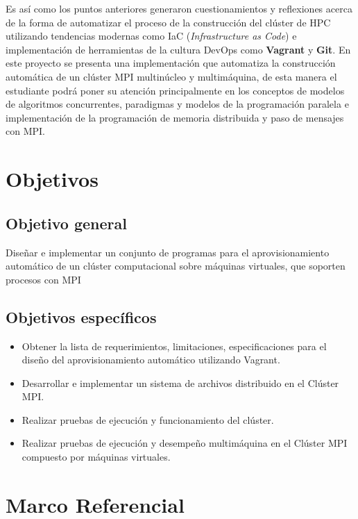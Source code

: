 \documentclass[letterpaper, 12pt, oneside]{article}
\begin{document}
    Es así como los puntos anteriores generaron cuestionamientos y reflexiones acerca de la forma de automatizar el proceso de la construcción del clúster de HPC utilizando tendencias modernas como IaC (\textit{Infrastructure as Code}) e implementación de herramientas de la cultura DevOps como \textbf{Vagrant} y \textbf{Git}. 
    En  este  proyecto  se  presenta  una  implementación que automatiza la construcción automática de un clúster MPI multinúcleo y multimáquina, de esta manera el estudiante podrá poner su atención principalmente en los conceptos de modelos de algoritmos concurrentes, paradigmas y modelos de la programación paralela e implementación de la programación de memoria distribuida y paso de mensajes con MPI. 
    
	\section{Objetivos}
	
	\subsection{Objetivo general}
	
	Diseñar e implementar un conjunto de programas para el aprovisionamiento automático de un clúster computacional sobre máquinas virtuales, que soporten procesos con MPI
	
	\subsection{Objetivos específicos}
	\begin{itemize}
    	\item Obtener la lista de requerimientos, limitaciones, especificaciones para el diseño del aprovisionamiento automático utilizando Vagrant.
    	\item Desarrollar e implementar un sistema de archivos distribuido en el Clúster MPI.
        \item Realizar pruebas de ejecución y funcionamiento del clúster.
        \item Realizar pruebas de ejecución y desempeño multimáquina en el Clúster MPI compuesto por máquinas virtuales.
    \end{itemize}

    \section{Marco Referencial}
\end{document}
